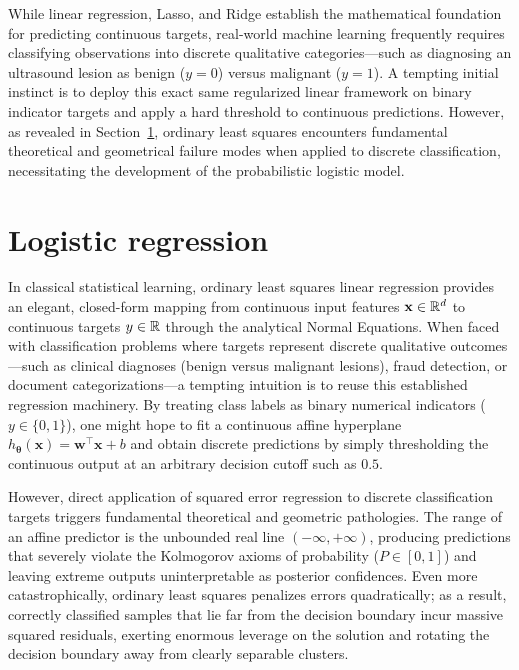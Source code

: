 While linear regression, Lasso, and Ridge establish the mathematical foundation for predicting continuous targets, real-world machine learning frequently requires classifying observations into discrete qualitative categories---such as diagnosing an ultrasound lesion as benign ($y=0$) versus malignant ($y=1$). A tempting initial instinct is to deploy this exact same regularized linear framework on binary indicator targets and apply a hard threshold to continuous predictions. However, as revealed in Section~\ref{sec:linear_to_logistic}, ordinary least squares encounters fundamental theoretical and geometrical failure modes when applied to discrete classification, necessitating the development of the probabilistic logistic model.

\section{Logistic regression}
\label{sec:linear_to_logistic}

In classical statistical learning, ordinary least squares linear regression provides an elegant, closed-form mapping from continuous input features $\mathbf{x} \in \mathbb{R}^d$ to continuous targets $y \in \mathbb{R}$ through the analytical Normal Equations. When faced with classification problems where targets represent discrete qualitative outcomes---such as clinical diagnoses (benign versus malignant lesions), fraud detection, or document categorizations---a tempting intuition is to reuse this established regression machinery. By treating class labels as binary numerical indicators ($y \in \{0, 1\}$), one might hope to fit a continuous affine hyperplane $h_{\boldsymbol{\theta}}(\mathbf{x}) = \mathbf{w}^\top \mathbf{x} + b$ and obtain discrete predictions by simply thresholding the continuous output at an arbitrary decision cutoff such as $0.5$.

However, direct application of squared error regression to discrete classification targets triggers fundamental theoretical and geometric pathologies. The range of an affine predictor is the unbounded real line $(-\infty, +\infty)$, producing predictions that severely violate the Kolmogorov axioms of probability ($P \in [0, 1]$) and leaving extreme outputs uninterpretable as posterior confidences. Even more catastrophically, ordinary least squares penalizes errors quadratically; as a result, correctly classified samples that lie far from the decision boundary incur massive squared residuals, exerting enormous leverage on the solution and rotating the decision boundary away from clearly separable clusters.

